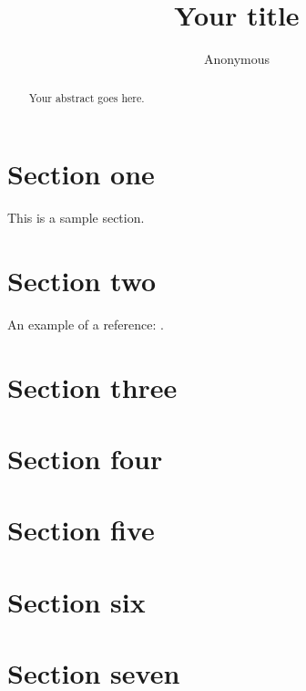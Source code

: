 \documentclass[11pt]{article} %
\title{Your title}
\author{Anonymous}
\theoremstyle{plain}
\theoremstyle{definition}
\begin{document}
\maketitle

\declaration

\begin{abstract}
  Your abstract goes here.
\end{abstract}

\section{Section one}

This is a sample section.

\section{Section two}

An example of a reference:
\cite{hastie/etal:2009}.

\section{Section three}
\section{Section four}
\section{Section five}
\section{Section six}
\section{Section seven}



\end{document}

